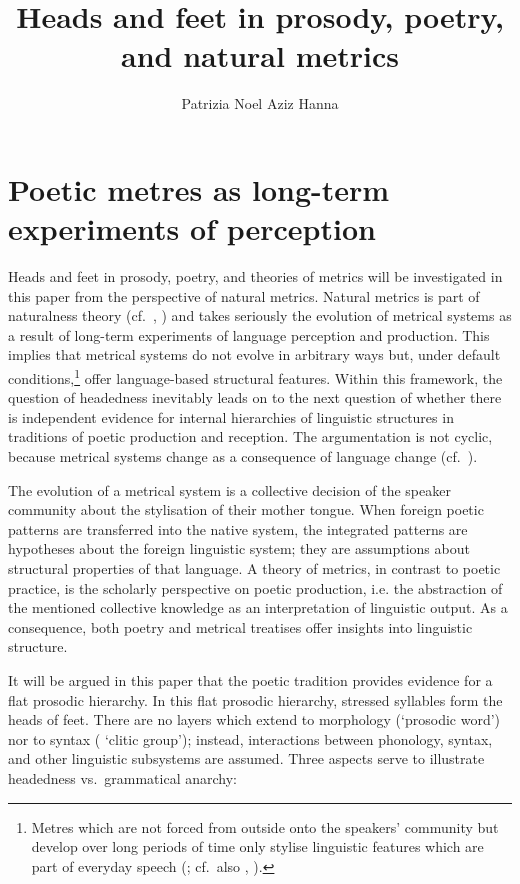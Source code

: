 \documentclass[output=paper
  ,nobabel
  ,uniformtopskip %
]{langscibook}
\title{Heads and feet in prosody, poetry, and natural metrics}
\author{Patrizia {Noel Aziz Hanna}\orcid{0000-0001-7016-8587}\affiliation{Otto-Friedrich-Universität Bamberg}}
\begin{document}
\maketitle
\section{Poetic metres as long-term experiments of perception}\label{sec-long-term}

Heads and feet in prosody, poetry, and theories of metrics will be investigated in this paper from the perspective of natural metrics. Natural metrics is part of naturalness theory (cf.\ \citealt{Donegan1979}, \citealt{HurchNathan1996}) and takes seriously the evolution of metrical systems as a result of long-term experiments of language perception and production. This implies that metrical systems do not evolve in arbitrary ways but, under default conditions,\footnote{{Metres which are not forced from outside onto the speakers' community but develop over long periods of time only stylise linguistic features which are part of everyday speech (\citealt{Vennemann1995}; cf.\ also \citealt{Miller1902}, \citealt{Allen1973}).} } offer language-based structural features. Within this framework, the question of headedness inevitably leads on to the next question of whether there is independent evidence for internal hierarchies of linguistic structures in traditions of poetic production and reception. The argumentation is not cyclic, because metrical systems change as a consequence of language change (cf.\ \eg  \cite{NoelAzizHanna2008a}).

The evolution of a metrical system is a collective decision of the speaker community about the stylisation of their mother tongue. When foreign poetic patterns are transferred into the native system, the integrated patterns are hypotheses about the foreign linguistic system; they are assumptions about structural properties of that language. A theory of metrics, in contrast to poetic practice, is the scholarly perspective on poetic production, i.e. the abstraction of the mentioned collective knowledge as an interpretation of linguistic output. As a consequence, both poetry and metrical treatises offer insights into linguistic structure.

It will be argued in this paper that the  poetic tradition provides evidence for a flat
prosodic hierarchy. In this flat prosodic hierarchy, stressed syllables form the heads of
feet. There are no layers which extend to morphology (\eg `prosodic word') nor to syntax (\eg
`clitic group'); instead, interactions between phonology, syntax, and other linguistic subsystems
are assumed. Three aspects serve to illustrate headedness vs.\ grammatical anarchy:
\end{document}
